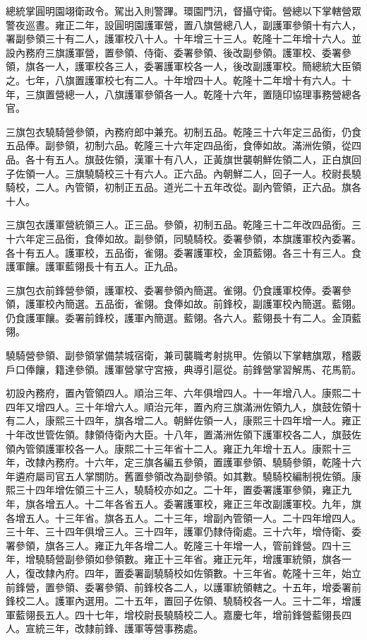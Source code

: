 \begin{pinyinscope}
總統掌圓明園翊衛政令。駕出入則警蹕。環園門汛，督攝守衛。營總以下掌轄營眾警夜巡晝。雍正二年，設圓明園護軍營，置八旗營總八人，副護軍參領十有六人，署副參領三十有二人，護軍校八十人。十年增三十三人。乾隆十二年增十六人。並設內務府三旗護軍營，置參領、侍衛、委署參領、後改副參領。護軍校、委署參領，旗各一人，護軍校各三人，委署護軍校各一人，後改副護軍校。簡總統大臣領之。七年，八旗置護軍校七有二人。十年增四十人。乾隆十二年增十有六人。十年，三旗置營總一人，八旗護軍參領各一人。乾隆十六年，置隨印協理事務營總各官。

三旗包衣驍騎營參領，內務府郎中兼充。初制五品。乾隆三十六年定三品銜，仍食五品俸。副參領，初制六品。乾隆三十六年定四品銜，食俸如故。滿洲佐領，從四品。各十有五人。旗鼓佐領，漢軍十有八人，正黃旗世襲朝鮮佐領二人，正白旗回子佐領一人。三旗驍騎校三十有六人。正六品。內朝鮮二人，回子一人。校尉長驍騎校，二人。內管領，初制正五品。道光二十五年改從。副內管領，正六品。旗各十人。

三旗包衣護軍營統領三人。正三品。參領，初制五品。乾隆三十二年改四品銜。三十六年定三品銜，食俸如故。副參領，同驍騎校。委署參領，本旗護軍校內委署。各十有五人。護軍校，五品銜，雀翎。委署護軍校，金頂藍翎。各三十有三人。食護軍饟。護軍藍翎長十有五人。正九品。

三旗包衣前鋒營參領，護軍校、委署參領內簡選。雀翎。仍食護軍校俸。委署參領，護軍校內簡選。五品銜，雀翎。食俸如故。前鋒校，副護軍校內簡選。藍翎。仍食護軍饟。委署前鋒校，護軍內簡選。藍翎。各六人。藍翎長十有二人。金頂藍翎。

驍騎營參領、副參領掌備禁城宿衛，兼司襲職考射挑甲。佐領以下掌轄旗眾，稽覈戶口俸饟，籍達參領。護軍營掌守宮掖，典導引扈從。前鋒營掌習解馬、花馬箭。

初設內務府，置內管領四人。順治三年、六年俱增四人。十一年增八人。康熙二十四年又增四人。三十年增六人。順治元年，置內府三旗滿洲佐領九人，旗鼓佐領十有二人，康熙三十四年，旗各增二人。朝鮮佐領一人，康熙三十四年增一人。雍正十年改世管佐領。隸領侍衛內大臣。十八年，置滿洲佐領下護軍校各二人，旗鼓佐領內管領護軍校各一人。康熙二十三年省十二人。雍正九年增十五人。康熙十三年，改隸內務府。十六年，定三旗各編五參領，置護軍參領、驍騎參領，乾隆十六年遴府屬司官五人掌關防。舊置參領改為副參領。如其數。驍騎校編制視佐領。康熙三十四年增佐領三十三人，驍騎校亦如之。二十年，置委署護軍參領，雍正九年，旗各增五人。十二年各省五人。委署護軍校，雍正三年改副護軍校。九年，旗各增五人。十三年省。旗各五人。二十三年，增副內管領一人。二十四年增四人。三十年、三十四年俱增三人。三十四年，護軍仍隸侍衛處。三十六年，增侍衛、委署參領，旗各三人。雍正九年各增二人。乾隆三十年增一人，管前鋒營。四十三年，增驍騎營副參領如參領數。雍正十三年省。雍正元年，增護軍統領，旗各一人，復改隸內府。四年，置委署副驍騎校如佐領數。十三年省。乾隆十三年，始立前鋒營，置參領、委署參領、前鋒校各二人，以護軍統領轄之。十五年，增委署前鋒校二人。護軍內選用。二十五年，置回子佐領、驍騎校各一人。三十二年，增護軍藍翎長五人。四十七年，增校尉長驍騎校二人。嘉慶七年，增前鋒營藍翎長四人。宣統三年，改隸前鋒、護軍等營事務處。


\end{pinyinscope}
